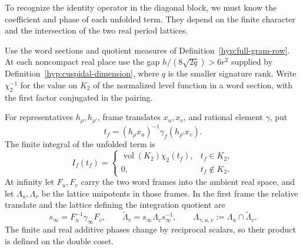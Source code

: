 To recognize the identity operator in the diagonal block, we must know the coefficient and phase of each unfolded term. They depend on the finite character and the intersection of the two real period lattices.

\begin{proposition}
\label{prop:gram-unfolded-measures}
Use the word sections and quotient measures of
Definition~\ref{hyp:full-gram-row}. At each noncompact real place
use the gap \(h/(8\sqrt{2q})>6r^2\) supplied by
Definition~\ref{hyp:cuspidal-dimension}, where \(q\) is the smaller
signature rank. Write \(\chi_2^{-1}\)
for the value on \(K_2\) of the normalized level function in a word
section, with the first factor conjugated in the pairing.

For representatives \(h_\rho,h_{\rho'}\),
frame translates \(x_u,x_v\), and rational element \(\gamma\), put
\[
 t_f=(h_\rho x_u)^{-1}\gamma_f(h_{\rho'}x_v).
\]
The finite integral of the unfolded term is 
\[
 I_f(t_f)=\begin{cases}\operatorname{vol}(K_2)\chi_2(t_f),&t_f\in K_2,\\ 0,&t_f\notin K_2.\end{cases}
\]
 At infinity let \(F_u,F_v\) carry the two word frames into the ambient real space, and let \(\Lambda_u,\Lambda_v\) be the lattice unipotents in those frames. In the first frame the relative translate and the lattice defining the integration quotient are 
\[
 s_\infty=F_u^{-1}\gamma_\infty F_v,\qquad \widetilde\Lambda_v=s_\infty\Lambda_v s_\infty^{-1},\qquad \Lambda_{\gamma,u,v}:=\Lambda_u\cap\widetilde\Lambda_v.
\]
 The finite and real additive phases change by reciprocal scalars, so their product is defined on the double coset.
\end{proposition}

